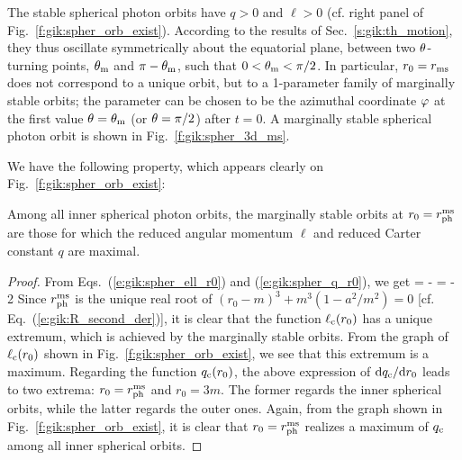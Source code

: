 The stable spherical photon orbits have $q>0$ and $\ell > 0$
(cf. right panel of Fig.~\ref{f:gik:spher_orb_exist}).
According to the results of Sec.~\ref{s:gik:th_motion}, they
thus oscillate symmetrically about the equatorial plane, between
two $\theta$-turning points, $\theta_{\rm m}$ and $\pi-\theta_{\rm m}$, such that $0<\theta_{\rm m}<\pi/2$.
In particular, $r_0 = r_{\rm ms}$ does not correspond to a unique orbit, but
to a 1-parameter family of marginally stable orbits; the parameter can be chosen
to be the azimuthal coordinate $\varphi$ at the first value $\theta=\theta_{\rm m}$ (or $\theta=\pi/2$)
after $t=0$. A marginally stable spherical photon orbit is
shown in Fig.~\ref{f:gik:spher_3d_ms}.

We have the following property, which appears clearly on Fig.~\ref{f:gik:spher_orb_exist}:
\begin{prop}
Among all inner spherical photon orbits, the marginally stable orbits
at $r_0 = r_{\rm ph}^{\rm ms}$ are those for which the reduced angular momentum $\ell$
and reduced Carter constant $q$ are maximal.
\end{prop}
\begin{proof}
From Eqs.~(\ref{e:gik:spher_ell_r0}) and (\ref{e:gik:spher_q_r0}), we get
\be \label{e:gik:spher_orb_dqdr}
    = - 
\ee
\be
    = - 2 
\ee
Since $r_{\rm ph}^{\rm ms}$ is the unique real root of
$(r_0 - m)^3 + m^3 (1 - a^2/m^2) = 0$ [cf. Eq.~(\ref{e:gik:R_second_der})],
it is clear that the function $\ell_{\rm c}(r_0)$ has a unique extremum, which is
achieved by the marginally stable orbits. From the graph of $\ell_{\rm c}(r_0)$
shown in Fig.~\ref{f:gik:spher_orb_exist}, we see that this extremum is
a maximum. Regarding the function $q_{\rm c}(r_0)$, the above expression of $\mathrm{d} q_{\rm c}/\mathrm{d} r_0$
leads to two extrema: $r_0 = r_{\rm ph}^{\rm ms}$ and $r_0 = 3 m$.
The former regards the inner spherical orbits, while the latter regards
the outer ones. Again, from the graph shown in Fig.~\ref{f:gik:spher_orb_exist},
it is clear that $r_0 = r_{\rm ph}^{\rm ms}$ realizes a maximum of $q_{\rm c}$
among all inner spherical orbits.
\end{proof}

